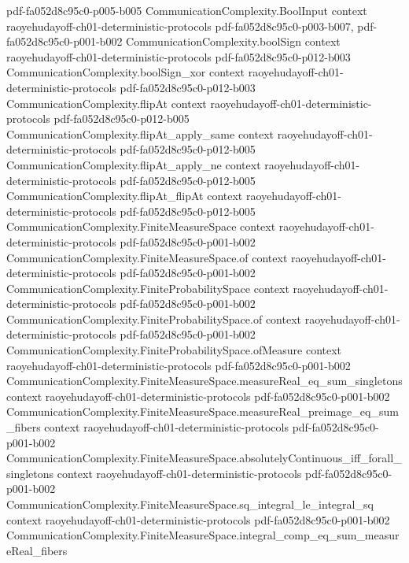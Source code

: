 \begin{theorem}
{    pdf-fa052d8c95c0-p005-b005}
\proofstep
  {CommunicationComplexity.BoolInput}
  {context}
  {raoyehudayoff-ch01-deterministic-protocols}
  {pdf-fa052d8c95c0-p003-b007,
    pdf-fa052d8c95c0-p001-b002}
\proofstep
  {CommunicationComplexity.boolSign}
  {context}
  {raoyehudayoff-ch01-deterministic-protocols}
  {pdf-fa052d8c95c0-p012-b003}
\proofstep
  {CommunicationComplexity.boolSign_xor}
  {context}
  {raoyehudayoff-ch01-deterministic-protocols}
  {pdf-fa052d8c95c0-p012-b003}
\proofstep
  {CommunicationComplexity.flipAt}
  {context}
  {raoyehudayoff-ch01-deterministic-protocols}
  {pdf-fa052d8c95c0-p012-b005}
\proofstep
  {CommunicationComplexity.flipAt_apply_same}
  {context}
  {raoyehudayoff-ch01-deterministic-protocols}
  {pdf-fa052d8c95c0-p012-b005}
\proofstep
  {CommunicationComplexity.flipAt_apply_ne}
  {context}
  {raoyehudayoff-ch01-deterministic-protocols}
  {pdf-fa052d8c95c0-p012-b005}
\proofstep
  {CommunicationComplexity.flipAt_flipAt}
  {context}
  {raoyehudayoff-ch01-deterministic-protocols}
  {pdf-fa052d8c95c0-p012-b005}
\proofstep
  {CommunicationComplexity.FiniteMeasureSpace}
  {context}
  {raoyehudayoff-ch01-deterministic-protocols}
  {pdf-fa052d8c95c0-p001-b002}
\proofstep
  {CommunicationComplexity.FiniteMeasureSpace.of}
  {context}
  {raoyehudayoff-ch01-deterministic-protocols}
  {pdf-fa052d8c95c0-p001-b002}
\proofstep
  {CommunicationComplexity.FiniteProbabilitySpace}
  {context}
  {raoyehudayoff-ch01-deterministic-protocols}
  {pdf-fa052d8c95c0-p001-b002}
\proofstep
  {CommunicationComplexity.FiniteProbabilitySpace.of}
  {context}
  {raoyehudayoff-ch01-deterministic-protocols}
  {pdf-fa052d8c95c0-p001-b002}
\proofstep
  {CommunicationComplexity.FiniteProbabilitySpace.ofMeasure}
  {context}
  {raoyehudayoff-ch01-deterministic-protocols}
  {pdf-fa052d8c95c0-p001-b002}
\proofstep
  {CommunicationComplexity.FiniteMeasureSpace.measureReal_eq_sum_singletons}
  {context}
  {raoyehudayoff-ch01-deterministic-protocols}
  {pdf-fa052d8c95c0-p001-b002}
\proofstep
  {CommunicationComplexity.FiniteMeasureSpace.measureReal_preimage_eq_sum_fibers}
  {context}
  {raoyehudayoff-ch01-deterministic-protocols}
  {pdf-fa052d8c95c0-p001-b002}
\proofstep
  {CommunicationComplexity.FiniteMeasureSpace.absolutelyContinuous_iff_forall_singletons}
  {context}
  {raoyehudayoff-ch01-deterministic-protocols}
  {pdf-fa052d8c95c0-p001-b002}
\proofstep
  {CommunicationComplexity.FiniteMeasureSpace.sq_integral_le_integral_sq}
  {context}
  {raoyehudayoff-ch01-deterministic-protocols}
  {pdf-fa052d8c95c0-p001-b002}
\proofstep
  {CommunicationComplexity.FiniteMeasureSpace.integral_comp_eq_sum_measureReal_fibers}

\end{theorem}
